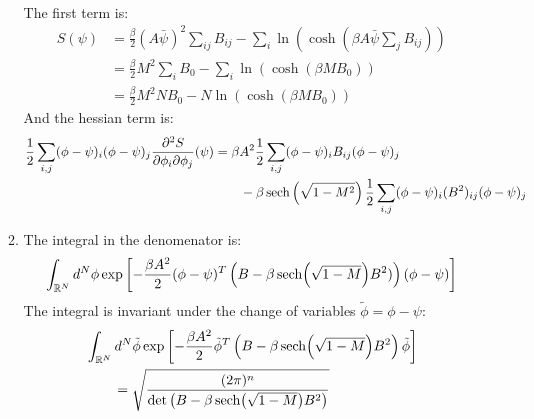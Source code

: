 \documentclass[12pt,a4]{article}
\begin{document}
\begin{enumerate}
\begin{enumerate}
\begin{align*}
        \end{align*}
        The first term is:
        \begin{align*}
          S(\psi) &= \frac{\beta}{2} (A\bar{\psi})^2 \sum_{i j} B_{ij} - \sum_i \ln(\cosh(\beta A\bar{\psi}\sum_jB_{ij}))\\
                  &= \frac{\beta}{2} M^2 \sum_{i } B_{0} - \sum_i \ln(\cosh(\beta M B_0))\\
                  &= \frac{\beta}{2} M^2 N B_{0} - N \ln(\cosh(\beta M B_0))
        \end{align*}
        And the hessian term is:
        \begin{align*}
          \frac{1}{2}\sum_{i,j}(\phi - \psi)_i (\phi - \psi)_j \frac{\partial^2 S}{\partial \phi_i \partial \phi_j}(\psi) &= \beta A^2  \frac{1}{2}\sum_{i,j}(\phi - \psi)_i B_{ij} (\phi - \psi)_j  \\
               & \qquad   - \beta \sech\left(\sqrt{1 - M^2}\right) \frac{1}{2}\sum_{i,j} (\phi - \psi)_i (B^2)_{ij} (\phi - \psi)_j
        \end{align*}
      \item
        The integral in the denomenator is:
        \begin{align*}
          \int_{\mathbb{R}^N} d^N\phi \exp\left[-\frac{\beta A^2}{2}(\phi - \psi)^T\left(B  - \beta \sech (\sqrt{1 - M})B^2)\right) (\phi - \psi)\right]
        \end{align*}
        The integral is invariant under the change of variables $\tilde\phi = \phi - \psi$:
        \begin{align*}
          &\int_{\mathbb{R}^N} d^N\tilde\phi \exp\left[-\frac{\beta A^2}{2}\tilde\phi^T\left(B  - \beta \sech (\sqrt{1 - M})B^2\right) \tilde\phi\right]\\
          & \qquad = \sqrt{\frac{(2 \pi)^n}{\det\left( B  - \beta \sech (\sqrt{1 - M})B^2\right)}}
        \end{align*}
    \end{enumerate}
\end{enumerate}
\end{document}
